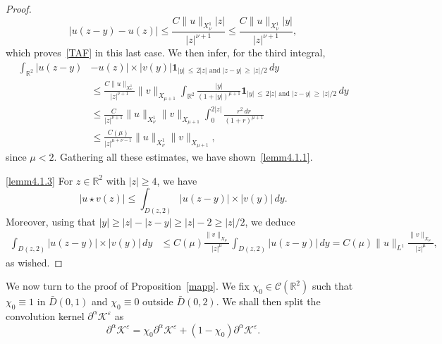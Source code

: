 \documentclass[AHL,Unicode,longabstracts,published]{cedram}
\newcommand*\p{\partial}
\newcommand*\R{\mathbb R}
\newcommand*\BC{\mathcal{C}}
\newcommand*\BK{\mathcal{K}}
\newcommand{\bfun}{\mathbf{1}}
\newcommand*\gs{\geqslant }
\newcommand*\ls{\leqslant }
\newcommand*\e{\varepsilon}
\begin{document}
\begin{proof}
\[
\lvert u (z-y) - u (z) \rvert
\ls \frac{C \| u \|_{X^1_\nu} |z|}{ |z|^{\nu+1} }
\ls \frac{C \| u \|_{X^1_\nu} |y|}{ |z|^{\nu+1} },
\]
which proves~\eqref{TAF} in this last case. We then infer, for the third integral,
\begin{align*}
\int_{\R^2} \lvert u (z-y) & - u (z) \rvert \times \lvert v(y) \rvert \bfun_{|y|\,\ls\,2 |z| \text{ and } |z-y|\,\gs\,|z| /2 } \, dy
\\
& \ls
\frac{C \| u \|_{X^1_\nu} }{|z|^{\nu+1}}
\| v \|_{X_{\mu+1} } \int_{\R^2} \frac{ |y|}{ (1 + |y|)^{\mu+1} } \bfun_{|y|\,\ls\,2 |z| \text{ and } |z-y|\,\gs\,|z| /2 } \, dy
\\
& \ls
\frac{C}{|z|^{\nu +1}} \| u \|_{X^1_\nu} \| v \|_{X_{\mu+1} }
\int_0^{2|z|} \frac{ r^2 \, dr}{ (1 + r)^{\mu+1} }
\\
& \ls
\frac{C(\mu)}{|z|^{\mu + \nu-1 }} \| u \|_{X^1_\nu} \| v \|_{X_{\mu+1} },
\end{align*}
since $ \mu < 2 $. Gathering all these estimates, we have shown~\eqref{lemm4.1.1}.

\noindent\eqref{lemm4.1.3} For $ z \in \R^2 $ with $ |z| \gs 4 $, we have
\[
\lvert u \star v (z) \rvert
\ls \int_{D(z,2)} \lvert u (z-y) \rvert \times \lvert v (y) \rvert \, dy.
\]
Moreover, using that $ |y| \gs |z| - |z-y| \gs |z| - 2 \gs |z|/2 $, we deduce
\begin{align*}
\int_{D(z,2) } \lvert u (z-y) \rvert \times \lvert v(y) \rvert \, dy & \ls C(\mu)
\frac{ \| v \|_{X_{\mu}} }{ \lvert z \rvert^{\mu } }
\int_{D(z,2)} \lvert u (z-y) \rvert \, dy = C(\mu) \| u \|_{L^1 }
\frac{ \| v \|_{X_{\mu}} }{ \lvert z \rvert^{\mu } },
\end{align*}
as wished.
\end{proof}



We now turn to the proof of Proposition~\ref{mapp}. We fix $ \chi_0 \in \BC (\R^2) $ such that $ \chi_0 \equiv 1 $ in $ \bar{D}(0,1) $ and $ \chi_0 \equiv 0 $ outside $ \bar{D}(0,2) $. We shall then split the convolution kernel $ \p^\alpha \BK^\e $ as
\[
\p^\alpha \BK^\e = \chi_0 \p^\alpha \BK^\e + (1 - \chi_0) \p^\alpha \BK^\e.
\]
\end{document}
